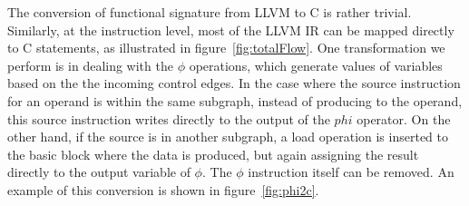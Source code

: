 The conversion of functional signature from LLVM to C is rather trivial.
Similarly, at the instruction level, 
most of the LLVM IR can be mapped
directly to C statements, as illustrated in figure~\ref{fig:totalFlow}. One
transformation we perform is in dealing with the $\phi$ operations, which generate
 values of variables based on the the incoming control edges.  In the case where the source instruction for an operand is within the same subgraph, instead of
 producing to the operand, this source instruction writes directly to the output
 of the $phi$ operator.
 On the other hand, if the source
is in another subgraph, a load operation is inserted to the basic block
where the data is produced, but again assigning the result directly
to the output variable of $\phi$. The $\phi$
instruction itself can be removed. An example of this conversion is
shown in figure~\ref{fig:phi2c}.

